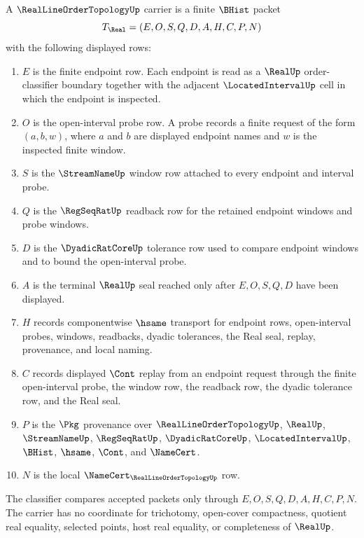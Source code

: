 \begin{definition}
\label{def:real-line-order-topology-carrier}
A $\RealLineOrderTopologyUp$ carrier is a finite $\BHist$ packet
$$
T_{\Real}=(E,O,S,Q,D,A,H,C,P,N)
$$
with the following displayed rows:
\begin{enumerate}
\item $E$ is the finite endpoint row. Each endpoint is read as a $\RealUp$ order-classifier boundary together with the adjacent $\LocatedIntervalUp$ cell in which the endpoint is inspected.
\item $O$ is the open-interval probe row. A probe records a finite request of the form $(a,b,w)$, where $a$ and $b$ are displayed endpoint names and $w$ is the inspected finite window.
\item $S$ is the $\StreamNameUp$ window row attached to every endpoint and interval probe.
\item $Q$ is the $\RegSeqRatUp$ readback row for the retained endpoint windows and probe windows.
\item $D$ is the $\DyadicRatCoreUp$ tolerance row used to compare endpoint windows and to bound the open-interval probe.
\item $A$ is the terminal $\RealUp$ seal reached only after $E,O,S,Q,D$ have been displayed.
\item $H$ records componentwise $\hsame$ transport for endpoint rows, open-interval probes, windows, readbacks, dyadic tolerances, the Real seal, replay, provenance, and local naming.
\item $C$ records displayed $\Cont$ replay from an endpoint request through the finite open-interval probe, the window row, the readback row, the dyadic tolerance row, and the Real seal.
\item $P$ is the $\Pkg$ provenance over $\RealLineOrderTopologyUp$, $\RealUp$, $\StreamNameUp$, $\RegSeqRatUp$, $\DyadicRatCoreUp$, $\LocatedIntervalUp$, $\BHist$, $\hsame$, $\Cont$, and $\NameCert$.
\item $N$ is the local $\NameCert_{\RealLineOrderTopologyUp}$ row.
\end{enumerate}
The classifier compares accepted packets only through $E,O,S,Q,D,A,H,C,P,N$. The carrier has no coordinate for trichotomy, open-cover compactness, quotient real equality, selected points, host real equality, or completeness of $\RealUp$.
\end{definition}

